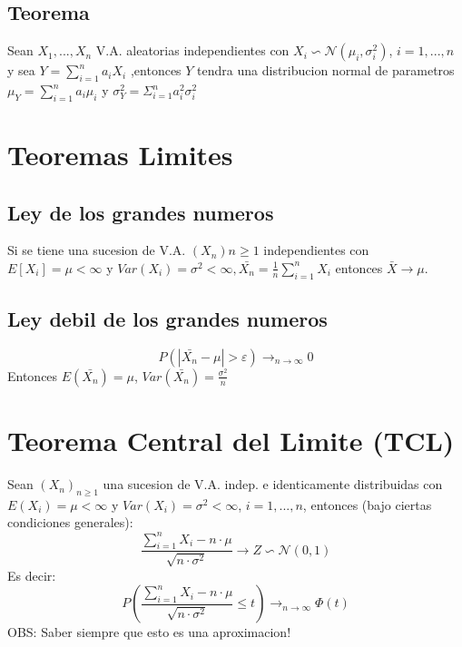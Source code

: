 \documentclass[titlepage,a4paper]{article}
\begin{document}
\subsection{Teorema}
Sean $X_{1},...,X_{n}$ V.A. aleatorias independientes con $X_{i} \backsim \mathcal{N}(\mu_{i}, \sigma^{2}_{i})$, $i=1,...,n$ y sea $Y = \sum_{i=1}^n a_{i}X_{i}$
,entonces $Y$ tendra una distribucion normal de parametros $\mu_{Y}  = \sum_{i=1}^{n} a_{i}\mu_{i}$ y 
$\sigma_{Y}^{2} = \Sigma_{i=1}^{n}a_{i}^{2}\sigma_{i}^{2}$
\section{Teoremas Limites}
\subsection{Ley de los grandes numeros}
Si se tiene una sucesion de V.A. $(X_{n})n \geq 1$ independientes con $E[X_{i}] = \mu < \infty$ y $Var(X_{i}) = \sigma^{2} < \infty, \bar{X_{n}} = \frac{1}{n}\sum_{i=1}^{n}X_{i}$ entonces $\bar{X} \rightarrow \mu$.\\
\subsection{Ley debil de los grandes numeros}
\begin{equation*}
    P(|\bar{X_{n}} - \mu| > \varepsilon) \rightarrow_{n \rightarrow \infty} 0
\end{equation*}
Entonces $E(\bar{X_{n}}) = \mu$, $Var(\bar{X_{n}}) = \frac{\sigma^{2}}{n}$
\section{Teorema Central del Limite (TCL)}
Sean $(X_{n})_{n \geq 1}$ una sucesion de V.A. indep. e identicamente distribuidas con $E(X_{i}) = \mu < \infty$ y $Var(X_{i}) = \sigma^{2} < \infty$, $i=1,...,n$, entonces (bajo ciertas condiciones generales):
\begin{equation*}
    \frac{\sum_{i=1}^{n}X_{i} - n\cdot\mu}{\sqrt{n\cdot \sigma^{2}}} \rightarrow Z \backsim \mathcal{N}(0,1)
\end{equation*}
Es decir:
\begin{equation*}
    P( \frac{\sum_{i=1}^{n}X_{i} - n\cdot\mu}{\sqrt{n\cdot \sigma^{2}}}\leq t) \rightarrow_{n\rightarrow \infty} \Phi(t)
\end{equation*}
OBS: Saber siempre que esto es una aproximacion!
\end{document}
